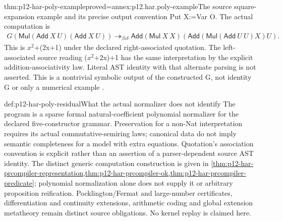 \begin{hbtheorem}{thm:p12-har-poly-example}{proved=annex:p12.har.poly-example}{The source square-expansion example and its precise output convention}
Put X:=Var O. The actual computation is
\[
\begin{aligned}
 G(\mathsf{Mul}(\mathsf{Add}\ X\ U)(\mathsf{Add}\ X\ U))
 \twoheadrightarrow_{\beta\iota\delta}
 \mathsf{Add}(\mathsf{Mul}\ X\ X)
  (\mathsf{Add}(\mathsf{Mul}(\mathsf{Add}\ U\ U)X)U).
\end{aligned}
\]
This is \(x^2\)+(2x+1) under the declared right-associated quotation.
The left-associated source reading (\(x^2\)+2x)+1 has the same interpretation
by the explicit addition-associativity law. Literal AST identity with
that alternate parsing is not asserted. This is a nontrivial symbolic
output of the constructed G, not identity G or only a numerical example
\cite[pp.~1221--1222]{BarendregtGeuvers2001}.
\end{hbtheorem}

\begin{proofboundary}{def:p12-har-poly-residual}{What the actual normalizer does not identify}
The program is a sparse formal natural-coefficient polynomial normalizer
for the declared five-constructor grammar. Preservation for a non-Nat
interpretation requires its actual commutative-semiring laws; canonical
data do not imply semantic completeness for a model with extra equations.
Quotation's association convention is explicit rather than an assertion
of a parser-dependent source AST identity. The distinct generic computation
construction is given in
\cref{thm:p12-har-prcompiler-representation,thm:p12-har-prcompiler-ok,thm:p12-har-prcompiler-predicate};
polynomial normalization alone does not supply it or arbitrary proposition
reification. Pocklington/Fermat and large-number certificates, differentiation and
continuity extensions, arithmetic coding and global extension metatheory
remain distinct source obligations. No kernel replay is claimed here.
\end{proofboundary}
